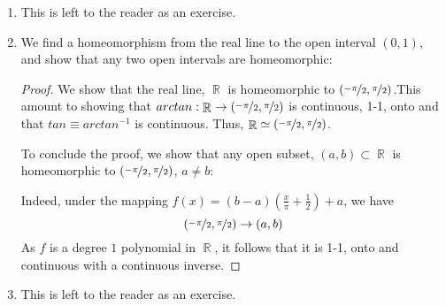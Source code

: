 \documentclass{book}
\DeclareMathOperator*{\R}{\mathbb{R}}
\begin{document}
\begin{enumerate}
    \item This is left to the reader as an exercise. 

    \item We find a homeomorphism from the real line to the open interval $(0,1)$, and show that any two open intervals are homeomorphic:
        \begin{proof} We show that the real line, $\R$ is homeomorphic to $(\nicefrac{-\pi}{2}, \nicefrac{\pi}{2})$.This amount to showing that $arctan: \R \rightarrow (\nicefrac{-\pi}{2}, \nicefrac{\pi}{2})$ is continuous, 1-1, onto and that $tan \equiv arctan^{-1}$ is continuous. Thus, $\R \simeq (\nicefrac{-\pi}{2}, \nicefrac{\pi}{2})$.  
            \par To conclude the proof, we show that any open subset, $(a,b) \subset \R$ is homeomorphic to $(\nicefrac{-\pi}{2}, \nicefrac{\pi}{2})$, $a \neq b$:
            \par Indeed, under the mapping $f(x) = (b-a)(\frac{x}{\pi} +\frac{1}{2}) +a$, we have 
            $$(\nicefrac{-\pi}{2}, \nicefrac{\pi}{2}) \rightarrow (a,b)$$
            As $f$ is a degree $1$ polynomial in $\R$, it follows that it is 1-1, onto and continuous with a continuous inverse. 
        \end{proof}

    \item This is left to the reader as an exercise.


\end{enumerate}
\end{document}
